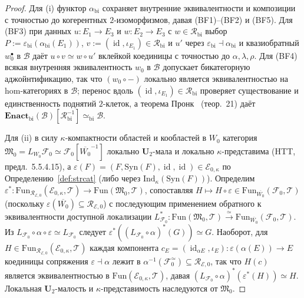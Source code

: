 \documentclass[11pt]{article}
\theoremstyle{plain}
\theoremstyle{definition}
\newcommand{\cF}{\mathcal{F}}
\newcommand{\fM}{\mathfrak{M}}
\newcommand{\Fun}{\mathrm{Fun}}
\newcommand{\Syn}{\mathrm{Syn}}
\newcommand{\cE}{\mathcal{E}}
\DeclareMathOperator{\id}{id}
\begin{document}
\begin{proof}
Для (i) функтор $\alpha_{\mathrm{bi}}$ сохраняет внутренние эквивалентности и композиции с точностью до когерентных $2$-изоморфизмов, давая (BF1)--(BF2) и (BF5). Для (BF3) при данных $u : E_1 \to E_3$ и $w : E_2 \to E_3$ с $w \in \mathcal{R}_{\mathrm{bi}}$ выбор $P := \varepsilon_{\mathrm{bi}}(\alpha_{\mathrm{bi}}(E_1))$, $v := (\id, \iota_{E_1}) \in \mathcal{R}_{\mathrm{bi}}$ и $u'$ через $\varepsilon_{\mathrm{bi}} \dashv \alpha_{\mathrm{bi}}$ и квазиобратный $w_0^\bullet$ в $\mathcal{B}$ даёт $u \circ v \simeq w \circ u'$ вклейкой коединицы с точностью до $\alpha, \lambda, \rho$. Для (BF4) всякая внутренняя эквивалентность $w_0$ в $\mathcal{B}$ допускает бикатегорную аджойнтификацию, так что $(w_0 \circ -)$ локально является эквивалентностью на hom-категориях в $\mathcal{B}$; перенос вдоль $(\id, \iota_{E_1}) \in \mathcal{R}_{\mathrm{bi}}$ проверяет существование и единственность поднятий $2$-клеток, а теорема Пронк~\cite{Pronk1996} (теор.~21) даёт $\mathbf{Enact}_{\mathrm{bi}}(\mathcal{B})[\mathcal{R}_{\mathrm{bi}}^{-1}] \simeq_{\mathrm{bi}} \mathcal{B}$.

Для (ii) в силу $\kappa$-компактности областей и кообластей в $W_0$ категория $\fM_0 = L_{W_0}\cF_0 \simeq \cF_0[\overline{W_0}^{-1}]$ локально $\mathbf{U}_2$-мала и локально $\kappa$-представима (HTT, предл.~5.5.4.15), а $\varepsilon(F) = (F, \Syn(F), \id, \id) \in \cE_{0,\kappa}$ по Определению~\ref{def:strcat} (либо через $\mathrm{Ind}_\kappa(\Syn(F))$). Определим $\varepsilon^* : \Fun_{\mathcal{R}_{\cE,0}}(\cE_{0,\kappa}, \mathcal{T}) \to \Fun(\fM_0, \mathcal{T})$, сопоставляя $H \mapsto H \circ \varepsilon \in \Fun_{\overline{W_0}}(\cF_0, \mathcal{T})$ (поскольку $\varepsilon(\overline{W_0}) \subseteq \mathcal{R}_{\cE,0}$) с последующим применением обратного к эквивалентности доступной локализации $L_{\cF_0}^* : \Fun(\fM_0, \mathcal{T}) \xrightarrow{\simeq} \Fun_{\overline{W_0}}(\cF_0, \mathcal{T})$. Из $L_{\cF_0} \circ \alpha \circ \varepsilon \simeq L_{\cF_0}$ следует $\varepsilon^*((L_{\cF_0} \circ \alpha)^*(G)) \simeq G$. Наоборот, для $H \in \Fun_{\mathcal{R}_{\cE,0}}(\cE_{0,\kappa}, \mathcal{T})$ каждая компонента $c_E = (\id_{\alpha E}, \iota_E) : \varepsilon(\alpha(E)) \to E$ коединицы сопряжения $\varepsilon \dashv \alpha$ лежит в $\alpha^{-1}(\cF_0^{\simeq}) \subseteq \mathcal{R}_{\cE,0}$, так что $H(c)$ является эквивалентностью в $\Fun(\cE_{0,\kappa}, \mathcal{T})$, давая $(L_{\cF_0} \circ \alpha)^*(\varepsilon^*(H)) \simeq H$. Локальная $\mathbf{U}_2$-малость и $\kappa$-представимость наследуются от $\fM_0$.
\end{proof}
\end{document}
